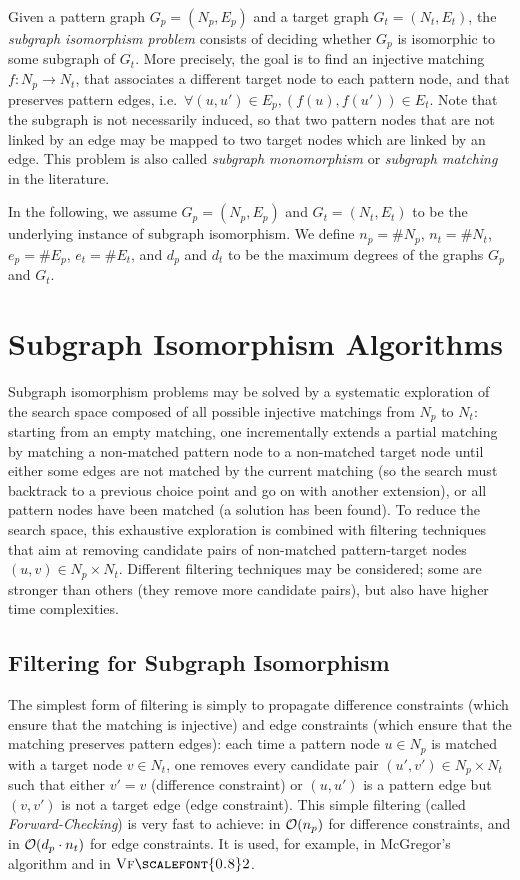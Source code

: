 \documentclass{llncs}
\newcommand{\VFtwo}{$\textsc{Vf{\scalefont{0.8}2}}$\xspace}
\begin{document}
Given a pattern graph $G_p=(N_p,E_p)$ and a target graph $G_t=(N_t,E_t)$, the \emph{subgraph
isomorphism problem} consists of deciding whether $G_p$ is isomorphic to some subgraph of $G_t$.
More precisely, the goal is to find an injective matching $f: N_p\rightarrow N_t$, that associates a
different target node to each pattern node, and that preserves pattern edges, i.e.\ $\forall (u,u')
\in E_p, (f(u),f(u')) \in E_t$.
Note that the subgraph is not necessarily induced, so that two pattern nodes that are not linked by
an edge may be mapped to two target nodes which are linked by an edge. This problem is also called
\emph{subgraph monomorphism} or \emph{subgraph matching} in the literature.

In the following, we assume $G_p=(N_p,E_p)$ and $G_t=(N_t,E_t)$ to be the underlying instance of 
subgraph isomorphism.  We  define $n_p = \# N_p$, $n_t = \# N_t$,  $e_p=\# E_p$, $e_t=\#
E_t$, and $d_p$ and $d_t$ to be the maximum degrees of the graphs $G_p$ and $G_t$.

\section{Subgraph Isomorphism Algorithms}

Subgraph isomorphism problems may be solved by a systematic exploration of the search space composed
of all possible injective matchings from $N_p$ to $N_t$: starting from an empty matching, one
incrementally extends a partial matching by matching a non-matched pattern node to a non-matched
target node until either some edges are not matched by the current matching (so the search must
backtrack to a previous choice point and go on with another extension), or all pattern nodes have
been matched (a solution has been found). To reduce the search space, this exhaustive exploration is
combined with filtering techniques that aim at removing candidate pairs of non-matched
pattern-target nodes $(u,v)\in N_p\times N_t$. Different filtering techniques may be considered;
some are stronger than others (they remove more candidate pairs), but also have higher time
complexities.

\subsection{Filtering for Subgraph Isomorphism}

The simplest form of filtering is simply to propagate difference constraints (which ensure that the
matching is injective) and edge constraints (which ensure that the matching preserves pattern
edges): each time a pattern node $u\in N_p$ is matched with a target node $v\in N_t$, one removes
every candidate pair $(u',v')\in N_p\times N_t$ such that either $v'=v$ (difference constraint) or
$(u,u')$ is a pattern edge but $(v,v')$ is not a target edge (edge constraint). This simple
filtering (called \emph{Forward-Checking}) is very fast to achieve: in ${\cal O}(n_p)$ for
difference constraints, and in ${\cal O}(d_p\cdot n_t)$ for edge constraints. It is used, for
example, in McGregor's algorithm \cite{mcgregor79} and in \VFtwo \cite{Cordella:2004}.
\end{document}
